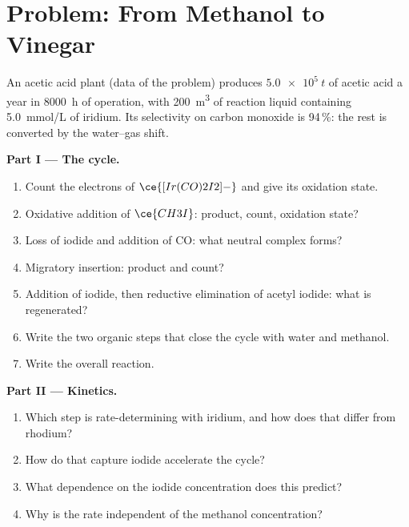 \section{Problem: From Methanol to Vinegar}

\begin{problem}
\label{pb:b3:homogeneous-catalysis:1}
An acetic acid plant (data of the problem) produces $\qty{5.0e5}{t}$ of acetic acid a year
in \qty{8000}{h} of operation, with \qty{200}{m^3} of reaction liquid containing \qty{5.0}{mmol/L} of
iridium. Its selectivity on carbon monoxide is 94\,\%: the rest is converted by the
water--gas shift.

\medskip\noindent\textbf{Part I --- The cycle.}
\begin{enumerate}
  \item Count the electrons of $\ce{[Ir(CO)2I2]-}$ and give its oxidation state.
  \item Oxidative addition of $\ce{CH3I}$: product, count, oxidation state?
  \item Loss of iodide and addition of CO: what neutral complex forms?
  \item Migratory insertion: product and count?
  \item Addition of iodide, then reductive elimination of acetyl iodide: what is
        regenerated?
  \item Write the two organic steps that close the cycle with water and methanol.
  \item Write the overall reaction.
\end{enumerate}

\medskip\noindent\textbf{Part II --- Kinetics.}
\begin{enumerate}[resume]
  \item Which step is rate-determining with iridium, and how does that differ from
        rhodium?
  \item How do  that capture iodide accelerate the cycle?
  \item What dependence on the iodide concentration does this predict?
  \item Why is the rate independent of the methanol concentration?
\end{enumerate}


\end{problem}
